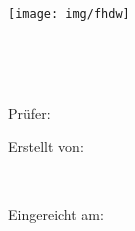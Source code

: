 
\begin{titlepage}

\begin{center}


\texttt{[image: img/fhdw]}\\

\vspace{.7cm}

\Huge{\bfseries\dokumententyp}

~\vspace{.5cm}\\

\LARGE{\dokumententitel}

~\vspace{1.3cm}\\


\large{

    Prüfer:\vspace{1mm}\\

    \dokumentenpruefer

\vspace{1.25cm}

Erstellt von:\\\vspace{1mm}

\dokumentenautor\\

\dokumentenautoradress


\vspace{1.25cm}

Eingereicht am:\vspace{1mm}\\

\abgabedatum

}

\end{center}


\end{titlepage}

